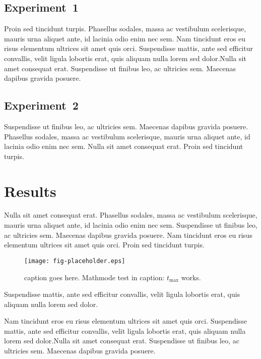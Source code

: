 \documentclass[12pt,oneside]{article}
\begin{document}
\subsection{Experiment~1}\label{experiment-1}

Proin sed tincidunt turpis. Phasellus sodales, massa ac vestibulum
scelerisque, mauris urna aliquet ante, id lacinia odio enim nec sem. Nam
tincidunt eros eu risus elementum ultrices sit amet quis orci.
Suspendisse mattis, ante sed efficitur convallis, velit ligula lobortis
erat, quis aliquam nulla lorem sed dolor.Nulla sit amet consequat erat.
Suspendisse ut finibus leo, ac ultricies sem. Maecenas dapibus gravida
posuere.

\subsection{Experiment~2}\label{experiment-2}

Suspendisse ut finibus leo, ac ultricies sem. Maecenas dapibus gravida
posuere. Phasellus sodales, massa ac vestibulum scelerisque, mauris urna
aliquet ante, id lacinia odio enim nec sem. Nulla sit amet consequat
erat. Proin sed tincidunt turpis.

\section{Results}\label{results}

Nulla sit amet consequat erat. Phasellus sodales, massa ac vestibulum
scelerisque, mauris urna aliquet ante, id lacinia odio enim nec sem.
Suspendisse ut finibus leo, ac ultricies sem. Maecenas dapibus gravida
posuere. Nam tincidunt eros eu risus elementum ultrices sit amet quis
orci. Proin sed tincidunt turpis.

\begin{figure}[htbp]
\centering
\texttt{[image: fig-placeholder.eps]}
\caption{caption goes here. Mathmode test in caption: \(t_\mathrm{max}\)
works.}
\end{figure}

Suspendisse mattis, ante sed efficitur convallis, velit ligula lobortis
erat, quis aliquam nulla lorem sed dolor.

Nam tincidunt eros eu risus elementum ultrices sit amet quis orci.
Suspendisse mattis, ante sed efficitur convallis, velit ligula lobortis
erat, quis aliquam nulla lorem sed dolor.Nulla sit amet consequat erat.
Suspendisse ut finibus leo, ac ultricies sem. Maecenas dapibus gravida
posuere.
\end{document}
